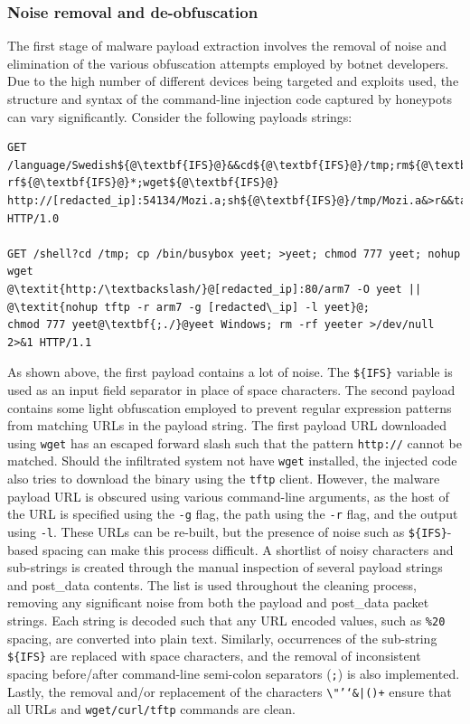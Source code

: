 \subsubsection{Noise removal and de-obfuscation}

The first stage of malware payload extraction involves the removal of noise and elimination of the various obfuscation attempts employed by botnet developers. Due to the high number of different devices being targeted and exploits used, the structure and syntax of the command-line injection code captured by honeypots can vary significantly. Consider the following payloads strings:

\begin{lstlisting}[escapechar=@, caption={Example of noisy and obfuscated botnet payloads. Examples of noise are highlighted in \textbf{bold}, and obfuscation in \textit{italics}.}]
GET /language/Swedish${@\textbf{IFS}@}&&cd${@\textbf{IFS}@}/tmp;rm${@\textbf{IFS}@}-rf${@\textbf{IFS}@}*;wget${@\textbf{IFS}@}
http://[redacted_ip]:54134/Mozi.a;sh${@\textbf{IFS}@}/tmp/Mozi.a&>r&&tar${@\textbf{IFS}@}/string.js HTTP/1.0

GET /shell?cd /tmp; cp /bin/busybox yeet; >yeet; chmod 777 yeet; nohup wget
@\textit{http:/\textbackslash/}@[redacted_ip]:80/arm7 -O yeet || @\textit{nohup tftp -r arm7 -g [redacted\_ip] -l yeet}@;
chmod 777 yeet@\textbf{;./}@yeet Windows; rm -rf yeeter >/dev/null 2>&1 HTTP/1.1
\end{lstlisting}

As shown above, the first payload contains a lot of noise. The \texttt{\$\{IFS\}} variable is used as an input field separator in place of space characters. The second payload contains some light obfuscation employed to prevent regular expression patterns from matching URLs in the payload string. The first payload URL downloaded using \texttt{wget} has an escaped forward slash such that the pattern \texttt{http://} cannot be matched. Should the infiltrated system not have \texttt{wget} installed, the injected code also tries to download the binary using the \texttt{tftp} client. However, the malware payload URL is obscured using various command-line arguments, as the host of the URL is specified using the \texttt{-g} flag, the path using the \texttt{-r} flag, and the output using \texttt{-l}. These URLs can be re-built, but the presence of noise such as \texttt{\$\{IFS\}}-based spacing can make this process difficult. A shortlist of noisy characters and sub-strings is created through the manual inspection of several payload strings and post\_data contents. The list is used throughout the cleaning process, removing any significant noise from both the payload and post\_data packet strings. Each string is decoded such that any URL encoded values, such as \texttt{\%20} spacing, are converted into plain text. Similarly, occurrences of the sub-string \texttt{\$\{IFS\}} are replaced with space characters, and the removal of inconsistent spacing before/after command-line semi-colon separators (\texttt{;}) is also implemented. Lastly, the removal and/or replacement of the characters \texttt{\textbackslash"'`\&|()+} ensure that all URLs and \texttt{wget/curl/tftp} commands are clean.


